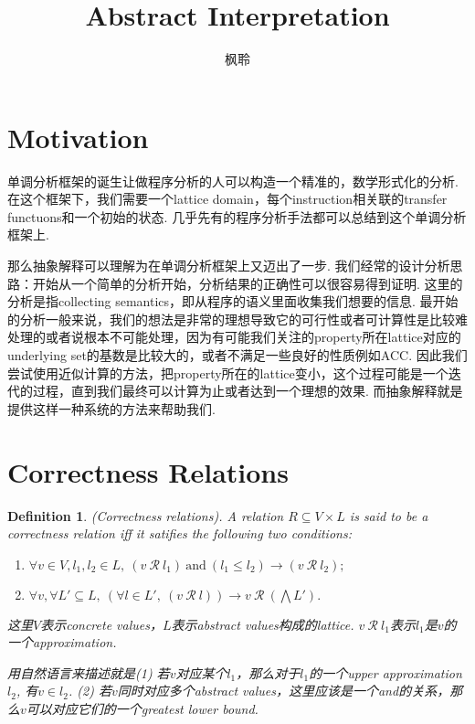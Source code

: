 \documentclass{article}
\newtheorem{definition}[theorem]{Definition}
\begin{document}
\title{Abstract Interpretation}
\author{枫聆}
\maketitle
\tableofcontents

\newpage
\section{Motivation}

单调分析框架的诞生让做程序分析的人可以构造一个精准的，数学形式化的分析. 在这个框架下，我们需要一个lattice domain，每个instruction相关联的transfer functuons和一个初始的状态. 几乎先有的程序分析手法都可以总结到这个单调分析框架上.

那么抽象解释可以理解为在单调分析框架上又迈出了一步. 我们经常的设计分析思路：开始从一个简单的分析开始，分析结果的正确性可以很容易得到证明. 这里的分析是指collecting semantics，即从程序的语义里面收集我们想要的信息. 最开始的分析一般来说，我们的想法是非常的理想导致它的可行性或者可计算性是比较难处理的或者说根本不可能处理，因为有可能我们关注的property所在lattice对应的underlying set的基数是比较大的，或者不满足一些良好的性质例如ACC. 因此我们尝试使用近似计算的方法，把property所在的lattice变小，这个过程可能是一个迭代的过程，直到我们最终可以计算为止或者达到一个理想的效果. 而抽象解释就是提供这样一种系统的方法来帮助我们.



\newpage
\section{Correctness Relations}

\begin{definition}
\rm {\color{red} (Correctness relations).} A relation $R \subseteq V \times L$ is said to be a correctness relation iff it satifies the following two conditions:
\begin{enumerate}
	\item $\forall v \in V,l_1,l_2 \in L,~(v~\mathcal{R}~l_1)~\text{and}~(l_1 \leq l_2) \rightarrow (v~\mathcal{R}~l_2);$
	\item $\forall v, \forall L' \subseteq L,~(\forall l \in L',~(v~ \mathcal{R}~l)) \rightarrow v~\mathcal{R}~(\bigwedge L').$
\end{enumerate} 

{\color{red} 这里$V$表示concrete values，$L$表示abstract values构成的lattice. $v~\mathcal{R}~l_1$表示$l_1$是$v$的一个approximation}.

{\color{blue} 用自然语言来描述就是(1) 若$v$对应某个$l_1$，那么对于$l_1$的一个upper approximation $l_2$, 有$v \in l_2$. (2) 若$v$同时对应多个abstract values，这里应该是一个and的关系，那么$v$可以对应它们的一个greatest lower bound}.
\end{definition}
\end{document}
